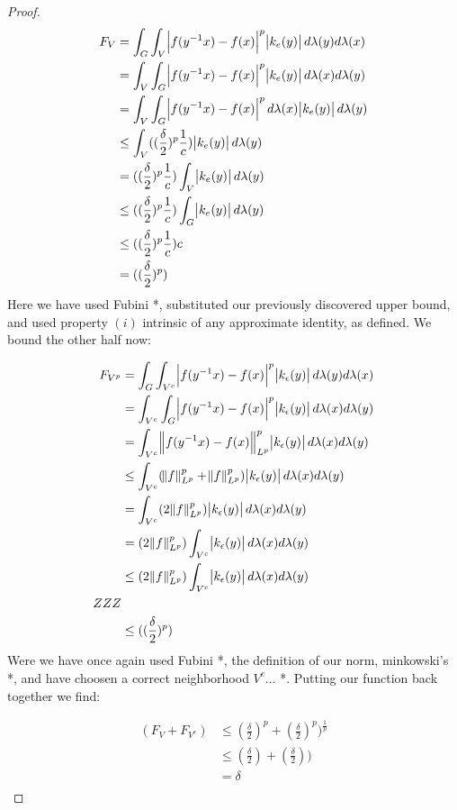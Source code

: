 \begin{proof}
\begin{align*}
F_V &= \int_G \int_V \abs{f(y^{-1}x)-f(x)}^p \abs{k_e(y)} d\lambda(y) d\lambda(x)\\
&= \int_V \int_G \abs{f(y^{-1}x)-f(x)}^p \abs{k_e(y)} d\lambda(x) d\lambda(y)\\
&= \int_V \int_G \abs{f(y^{-1}x)-f(x)}^p  d\lambda(x) \abs{k_e(y)} d\lambda(y)\\
&\leq \int_V ( (\frac{\delta}{2})^p \frac{1}{c} ) \abs{k_e(y)} d\lambda(y)\\
&= ( (\frac{\delta}{2})^p \frac{1}{c} ) \int_V  \abs{k_e(y)} d\lambda(y)\\
&\leq ( (\frac{\delta}{2})^p \frac{1}{c} ) \int_G  \abs{k_e(y)} d\lambda(y)\\
&\leq ( (\frac{\delta}{2})^p \frac{1}{c} ) c\\
&= ( (\frac{\delta}{2})^p )\\
\end{align*}
Here we have used Fubini *, substituted our previously discovered upper bound, and used property $(i)$ intrinsic of any approximate identity, as defined. We bound the other half now:

\begin{align*}
F_{V^p} &= \int_G \int_{V^c} \abs{f(y^{-1}x)-f(x)}^p \abs{k_\epsilon(y)} d\lambda(y) d\lambda(x) \\
&= \int_{V^c} \int_{G} \abs{f(y^{-1}x)-f(x)}^p \abs{k_\epsilon(y)} d\lambda(x) d\lambda(y) \\
&= \int_{V^c} \norm{f(y^{-1}x)-f(x)}^p_{L^p} \abs{k_\epsilon(y)} d\lambda(x) d\lambda(y) \\
&\leq \int_{V^c} (\norm{f}^p_{L^p}+\norm{f}^p_{L^p}) \abs{k_\epsilon(y)} d\lambda(x) d\lambda(y) \\
&= \int_{V^c} (2\norm{f}^p_{L^p}) \abs{k_\epsilon(y)} d\lambda(x) d\lambda(y) \\
&= (2\norm{f}^p_{L^p}) \int_{V^c} \abs{k_\epsilon(y)} d\lambda(x) d\lambda(y) \\
&\leq (2\norm{f}^p_{L^p}) \int_{V^c} \abs{k_\epsilon(y)} d\lambda(x) d\lambda(y) \\
ZZZ \\
&\leq ( (\frac{\delta}{2})^p )
\end{align*}
Were we have once again used Fubini *, the definition of our norm, minkowski's *, and have choosen a correct neighborhood $V^c$... *. Putting our function back together we find:

\begin{align*}
(F_V + F_{V^c}) &\leq (\frac{\delta}{2})^p + (\frac{\delta}{2})^p ) ^{\frac{1}{p}}\\
&\leq (\frac{\delta}{2})+(\frac{\delta}{2}))\\
&= \delta\\
\end{align*}


\end{proof}
